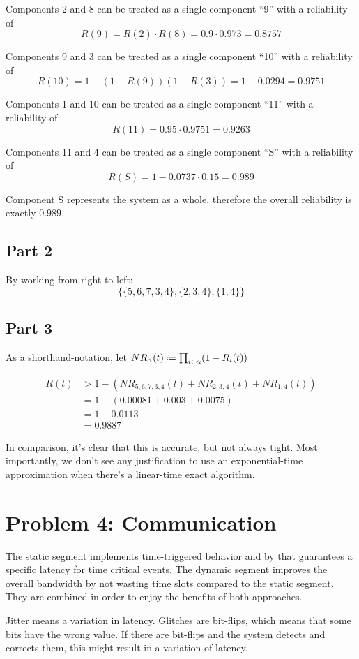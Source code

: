 \documentclass[a4paper,parskip,headheight=38pt]{scrartcl} %
\newcommand{\defeq}{\mathrel{\vcenter{\baselineskip0.5ex \lineskiplimit0pt
                    \hbox{\scriptsize.}\hbox{\scriptsize.}}}%
                    =}
\begin{document}
Components 2 and 8 can be treated as a single component \enquote{9} with a reliability of
\[R(9) = R(2) \cdot R(8) = 0.9 \cdot 0.973 = 0.8757\]

Components 9 and 3 can be treated as a single component \enquote{10} with a reliability of
\[R(10) = 1 - (1 - R(9))(1 - R(3)) = 1 - 0.0294 = 0.9751\]

Components 1 and 10 can be treated as a single component \enquote{11} with a reliability of
\[R(11) = 0.95 \cdot 0.9751 = 0.9263\]

Components 11 and 4 can be treated as a single component \enquote{S} with a reliability of
\[R(S) = 1 - 0.0737 \cdot 0.15 = 0.989\]

Component S represents the system as a whole, therefore the overall reliability is exactly $0.989$.

\subsection*{Part 2}

By working from right to left:
\[\{  \{5,6,7,3,4\}, \{2,3,4\}, \{1,4\}  \}\]

\subsection*{Part 3}

As a shorthand-notation, let $NR_{\alpha}(t) \defeq \prod_{i \in \alpha} (1-R_{i}(t))$

\begin{align*}
    R(t)
    &> 1-\left( NR_{5,6,7,3,4}(t) + NR_{2,3,4}(t) + NR_{1,4}(t) \right) \\
    &= 1-\left( 0.00081 + 0.003 + 0.0075 \right) \\
    &= 1 - 0.0113 \\
    &= 0.9887
\end{align*}

In comparison, it's clear that this is accurate, but not always tight.  Most
importantly, we don't see any justification to use an exponential-time
approximation when there's a linear-time exact algorithm.


\section*{Problem 4: Communication}
The static segment implements time-triggered behavior and by that guarantees a specific latency for time critical events. The dynamic segment improves the overall bandwidth by not wasting time slots compared to the static segment. They are combined in order to enjoy the benefits of both approaches.

Jitter means a variation in latency. Glitches are bit-flips, which means that some bits have the wrong value. If there are bit-flips and the system detects and corrects them, this might result in a variation of latency.
\end{document}
